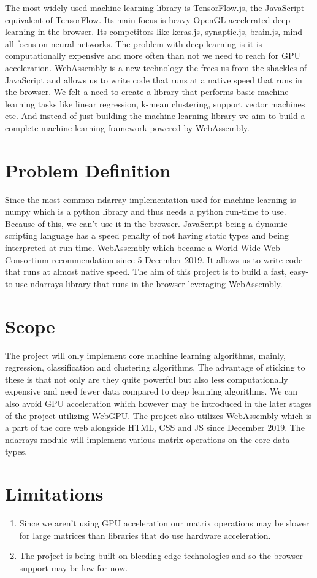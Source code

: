 \documentclass[a4paper,12pt]{report}
\begin{document}
The most widely used machine learning library is TensorFlow.js, the JavaScript
equivalent of TensorFlow. Its main focus is heavy OpenGL accelerated deep
learning in the browser. Its competitors like keras.js, synaptic.js, brain.js,
mind all focus on neural networks. The problem with deep learning is it is
computationally expensive and more often than not we need to reach for GPU
acceleration. WebAssembly is a new technology the frees us from the shackles of
JavaScript and allows us to write code that runs at a native speed that runs in
the browser. We felt a need to create a library that performs basic machine
learning tasks like linear regression, k-mean clustering, support vector
machines etc. And instead of just building the machine learning library we aim
to build a complete machine learning framework powered by WebAssembly.

\section{Problem Definition}
Since the most common ndarray implementation used for machine learning is
numpy which is a python library and thus needs a python run-time to use.
Because of this, we can't use it in the browser. JavaScript being a dynamic scripting language has a speed penalty of not having static types and
being interpreted at run-time. WebAssembly which became a World Wide Web
Consortium recommendation since 5 December 2019. It allows us to write code
that runs at almost native speed. The aim of this project is to build a fast, easy-to-use ndarrays library that runs in the browser leveraging WebAssembly.

\section{Scope}
The project will only implement core machine learning algorithms, mainly,
regression, classification and clustering algorithms. The advantage of sticking
to these is that not only are they quite powerful but also less computationally
expensive and need fewer data compared to deep learning algorithms. We can also
avoid GPU acceleration which however may be introduced in the later stages of
the project utilizing WebGPU. The project also utilizes WebAssembly which is a
part of the core web alongside HTML, CSS and JS since December 2019. The
ndarrays module will implement various matrix operations on the core data types.

\section{Limitations}

\begin{enumerate}
  \item Since we aren’t using GPU acceleration our matrix operations may be
        slower for large matrices than libraries that do use hardware
        acceleration.
  \item The project is being built on bleeding edge technologies and so the
        browser support may be low for now.
\end{enumerate}
\end{document}
